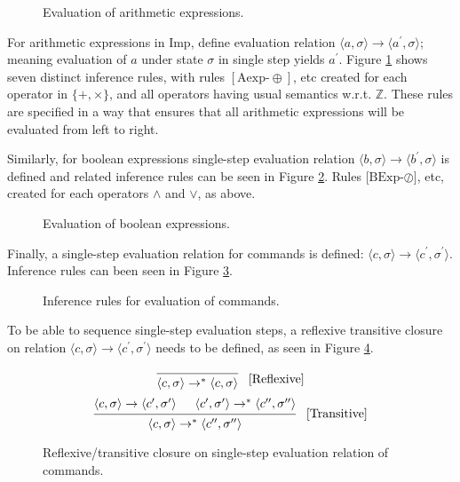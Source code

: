 \begin{figure}[htb]

\caption{Evaluation of arithmetic expressions.}
\label{infer-arith}
\end{figure}

For arithmetic expressions in Imp, define evaluation relation $\langle a, \sigma \rangle \rightarrow \langle a^\prime, \sigma  \rangle$; meaning evaluation of $a$ under state $\sigma$ in single step yields $a^\prime$. Figure \ref{infer-arith} shows seven distinct inference rules, with rules $[\text{Aexp-}\oplus]$, etc created for each operator in $\{+, \times \}$, and all operators having usual semantics w.r.t. $\mathbb{Z}$. These rules are specified in a way that ensures that all arithmetic expressions will be evaluated from left to right.


Similarly, for boolean expressions single-step evaluation relation $\langle b, \sigma \rangle \rightarrow \langle b^\prime, \sigma  \rangle$ is defined and related inference rules can be seen in Figure \ref{infer-bool}. Rules [$\text{BExp-}\oslash]$, etc, created for each operators $\land$ and $\lor$, as above.

\begin{figure}[htb]

\caption{Evaluation of boolean expressions.}
\label{infer-bool}
\end{figure}

Finally, a single-step evaluation relation for commands is defined: $\langle c, \sigma \rangle \rightarrow \langle c^\prime, \sigma^\prime \rangle$. Inference rules can been seen in Figure \ref{infer-comm}.

\begin{figure}[htb]

\caption{Inference rules for evaluation of commands.}
\label{infer-comm}
\end{figure}

To be able to sequence single-step evaluation steps, a reflexive transitive closure on relation $\langle c, \sigma \rangle \rightarrow \langle c^\prime, \sigma^\prime \rangle$ needs to be defined, as seen in Figure \ref{transitive-closure}.

\begin{figure}[ht]
\[
\begin{prooftree}
\infer0{
	\langle c, \sigma \rangle 
	\rightarrow^{*} \langle 
	c, \sigma \rangle
}
\end{prooftree} \; \; \; [\text{Reflexive}]
\]
\[
\begin{prooftree}
\hypo{
	\langle c, \sigma \rangle \rightarrow \langle c^\prime, \sigma^\prime \rangle
} 
\hypo{
	\langle c^\prime, \sigma^\prime \rangle \rightarrow^{*} \langle c^{\prime\prime}, \sigma^{\prime\prime} \rangle
}
\infer2{
	\langle c, \sigma \rangle \rightarrow^{*} \langle c^{\prime\prime}, \sigma^{\prime\prime} \rangle
}
\end{prooftree} \; \; \; [\text{Transitive}]
\]
\caption{Reflexive/transitive closure on single-step evaluation relation of commands.}
\label{transitive-closure}
\end{figure}


